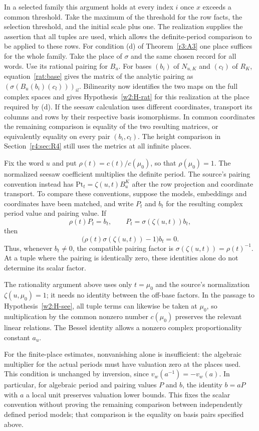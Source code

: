 In a selected family this argument holds at every index $i$ once $x$
exceeds a common threshold. Take the maximum of the threshold for
the row facts, the selection threshold, and the initial scale plus one.
The realization supplies the assertion that all tuples are used, which
allows the definite-period comparison to be applied to these rows.
For condition (d) of Theorem~\ref{r3:A3} one place suffices for the
whole family. Take the place of $\sigma$ and the same chosen record for
all words. Use its rational pairing for $B_u$. For bases $(b_i)$ of
$N_{u,K}$ and $(c_l)$ of $R_K$, equation~\eqref{rat:base} gives the
matrix of the analytic pairing as
$(\sigma(B_u(b_i)(c_l)))_{il}$. Bilinearity now identifies the two
maps on the full complex spaces and gives Hypothesis~\ref{w2:H-rat}
for this realization at the place required by (d). If the seesaw
calculation uses different coordinates, transport its columns and rows
by their respective basis isomorphisms. In common coordinates the
remaining comparison is equality of the two resulting matrices, or
equivalently equality on every pair $(b_i,c_l)$. The height comparison
in Section~\ref{r4:sec:R4} still uses the metrics at all infinite places.



\begin{remark}\label{w2:rat:normalization}
Fix the word $u$ and put $\rho(t)=c(t)/c(\mu_0)$, so that
$\rho(\mu_0)=1$. The normalized seesaw coefficient multiplies
the definite period. The source's pairing convention instead has
$\mathrm{Pt}_t=\zeta(u,t)B^K_u$ after the row projection and
coordinate transport. To compare these conventions, suppose the
models, embeddings and coordinates have been matched, and write
$P_t$ and $b_t$ for the resulting complex period value and
pairing value. If
\[
 \rho(t)P_t=b_t,\qquad P_t=\sigma(\zeta(u,t))b_t,
\]
then
\[
 \bigl(\rho(t)\sigma(\zeta(u,t))-1\bigr)b_t=0.
\]
Thus, whenever $b_t\ne0$, the compatible pairing factor is
$\sigma(\zeta(u,t))=\rho(t)^{-1}$.
At a tuple where the pairing is identically zero, these identities
alone do not determine its scalar factor.

The rationality argument above uses only $t=\mu_0$ and the source's
normalization $\zeta(u,\mu_0)=1$; it needs no identity between the
off-base factors. In the passage to Hypothesis~\ref{w2:H-see}, all
tuple terms can likewise be taken at $\mu_0$, so multiplication by
the common nonzero number $c(\mu_0)$ preserves the relevant linear
relations. The Bessel identity allows a nonzero complex
proportionality constant $a_u$.

For the finite-place estimates, nonvanishing alone is insufficient:
the algebraic multiplier for the actual periods must have valuation
zero at the places used. This condition is unchanged by inversion,
since $v_w(a^{-1})=-v_w(a)$. In particular, for algebraic period and
pairing values $P$ and $b$, the identity $b=aP$ with $a$ a local unit
preserves valuation lower bounds. This fixes the scalar convention without proving
the remaining comparison between independently defined period
models; that comparison is the equality on basis pairs specified above.
\end{remark}

